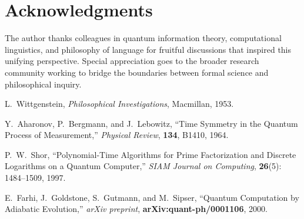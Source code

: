 \documentclass[11pt]{article}
\begin{document}
\section*{Acknowledgments}
The author thanks colleagues in quantum information theory, computational linguistics, and philosophy of language for fruitful discussions that inspired this unifying perspective. Special appreciation goes to the broader research community working to bridge the boundaries between formal science and philosophical inquiry.


\begin{thebibliography}{99}

L.~Wittgenstein,
\emph{Philosophical Investigations},
Macmillan, 1953.

Y.~Aharonov, P.~Bergmann, and J.~Lebowitz, 
``Time Symmetry in the Quantum Process of Measurement,''
\emph{Physical Review}, \textbf{134}, B1410, 1964.

P.~W.~Shor,
``Polynomial-Time Algorithms for Prime Factorization and Discrete Logarithms on a Quantum Computer,''
\emph{SIAM Journal on Computing}, \textbf{26}(5): 1484--1509, 1997.

E.~Farhi, J.~Goldstone, S.~Gutmann, and M.~Sipser,
``Quantum Computation by Adiabatic Evolution,''
\emph{arXiv preprint}, \textbf{arXiv:quant-ph/0001106}, 2000.

\end{thebibliography}
\end{document}

